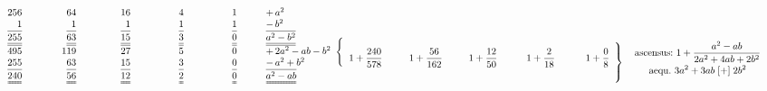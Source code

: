 \pend
\vspace{4.0em}%
%
\pstart
\noindent
$\begin{array}{rrrrrl} 
    \hspace{6pt} 256 & \hspace{36pt} 64 & \hspace{36pt}16 & \hspace{40pt}4 & \hspace{40pt}1 & \hspace{20pt}+\,a^2 \\ 
    1 & 1 & 1 & 1 & 1 & \hspace{20pt}
    -\,b^2 \\
    \underline{\underline{\overline{255\vphantom{ja^2}}}} & \underline{\underline{\overline{63\vphantom{ja^2}}}} & \underline{\underline{\overline{15\vphantom{ja^2}}}} & \underline{\underline{\overline{3\vphantom{ja^2}}}} & \underline{\underline{\overline{0\vphantom{ja^2}}}} & \hspace{20pt}\underline{\underline{\overline{a^2-b^2\vphantom{ja^2}}}} \\
    495 & 119 & 27 & 5 & 0 & \hspace{20pt}+\,2a^2-ab-b^2  \\
    255 & 63 & 15 & 3 & 0 & \hspace{20pt}-\,a^2+b^2 \\ 
    \overline{\uuline{240\vphantom{ja^2}}} & \overline{\uuline{56\vphantom{ja^2}}} & \overline{\uuline{12\vphantom{ja^2}}} & \overline{\uuline{2\vphantom{ja^2}}} & \overline{\uuline{0\vphantom{ja^2}}} & \hspace{20pt}\overline{\uuline{a^2-ab\vphantom{ja^2}}} \\
\end{array}
  \\
  \raisebox{-0.5em}[0pt][0pt]{$%
\left\{%
\begin{array}{l l l l l l }
	\\
	\hspace{0.70pt}1+\displaystyle \frac{240}{578}
	& %
	\hspace{17.5pt}1+\displaystyle \frac{56}{162}
	& %
	\hspace{17.0pt}1+\displaystyle \frac{12}{50}
	& %
	\hspace{20.0pt}1+\displaystyle \frac{2}{18}
	& %
	\hspace{21.5pt}1+\displaystyle \frac{0}{8}
	& \hspace{-5pt}\multirow{1}{*}{\raisebox{-1.0ex}[0pt][0pt]{$\left\}\hspace{11pt}%
	{\displaystyle \text{ascensus:} \ 1+\frac{a^2 - ab}{2a^2+4ab+2b^2\vphantom{j}}%
	\atop
	\displaystyle \text{aequ.}\ 3a^2 + 3ab\; [+]\; 2b^2} 
	\right. $ }}	
\end{array}
\right.$}$
